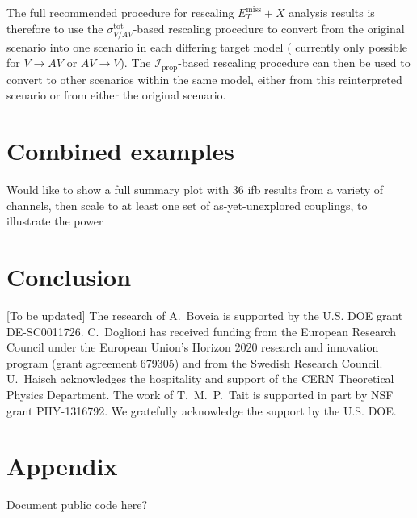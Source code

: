 \documentclass[a4paper, 11pt,notoc]{article}
\newcommand{\MET}{\ensuremath{E_T^\mathrm{miss}}\xspace}
\newcommand{\metplusx}{\ensuremath{\MET+X}\xspace}
\begin{document}
The full recommended procedure for rescaling \metplusx analysis results is therefore to use the $\sigma_{V/AV}^{\text{tot}}$-based rescaling procedure to convert from the original scenario into one scenario in each differing target model ({\color{red} currently only possible for $V\rightarrow AV$ or $AV\rightarrow V$}). The $\mathcal{I}_{\text{prop}}$-based rescaling procedure can then be used to convert to other scenarios within the same model, either from this reinterpreted scenario or from either the original scenario.

\section{Combined examples}

Would like to show a full summary plot with 36 ifb results from a variety of channels, then scale to at least one set of as-yet-unexplored couplings, to illustrate the power

\section{Conclusion}



\acknowledgments 

[To be updated] The research of A.~Boveia is supported by the U.S. DOE grant  DE-SC0011726. C.~Doglioni has received funding from the European Research Council under the European Union's Horizon 2020 research and innovation program (grant agreement 679305) and from the Swedish Research Council. U.~Haisch acknowledges the hospitality and support of the CERN Theoretical Physics Department. The work of T.~M.~P.~Tait is supported in part by NSF grant PHY-1316792. We gratefully acknowledge the support by the U.S. DOE. 


\appendix

\section{Appendix}
\label{app:recast}

Document public code here?

\newpage 



\end{document}
